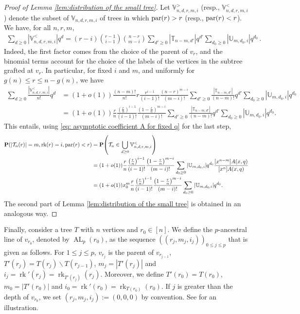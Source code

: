\documentclass{article}
\theoremstyle{remark}
\newcommand{\bT}{\mathbb{T}}
\newcommand{\abs}[1]{{\left|#1\right|}}
\newcommand{\cT}{\mathcal{T}}
\newcommand{\prob}[1]{\mathbf{P}{\left(#1\right)}}
\newcommand{\bV}{\mathbb{V}}
\newcommand{\bU}{\mathbb{U}}
\DeclareMathOperator{\rk}{rk}
\DeclareMathOperator{\AncestralLine}{AL}
\begin{document}
\begin{proof}[Proof of Lemma \ref{lem:distribution of the small tree}]
Let $\bV^>_{n,d,r,m,i}$ (resp., $\bV^<_{n,d,r,m,i}$) denote the subset of $\bV_{n,d,r,m,i}$ of trees in which ${\rm par}(r)>r$ (resp., ${\rm par}(r)<r$).
We have, for all $n,r,m$,
\begin{align*}
\sum_{d \geq 0} |\bV^<_{n,d,r,m,i}| q^d = (r-i)  \binom{r-1}{i-1} \binom{n-r}{m-i} \sum_{d' \geq 0} |\bT_{n-m,d'}| q^{d'} \sum_{d_0 \geq 0} |\bU_{m,d_0,i}|q^{d_0} \,.
\end{align*}
Indeed, the first factor comes from the choice of the parent of $v_r$, and the binomial terms account for the choice of the labels of the vertices in the subtree grafted at $v_r$. 
In particular, for fixed $i$ and $m$, and uniformly for $g(n) \leq r \leq n-g(n)$, we have
\begin{align*}
\sum_{d \geq 0} \frac{|\bV^<_{n,d,r,m,i}|}{n!} q^d &= (1+o(1))\frac{(n-m)!}{n!} r \frac{r^{i-1}}{(i-1)!} \frac{(n-r)^{m-i}}{(m-i)!} \sum_{d' \geq 0} \frac{|\bT_{n-m,d'}|}{(n-m)!} q^{d'} \sum_{d_0 \geq 0} |\bU_{m,d_0,i}|q^{d_0} \\
&= (1+o(1)) \frac{r}{n}  \frac{\left( \frac{r}{n} \right)^{i-1}}{(i-1)!} \frac{\left( 1 - \frac{r}{n} \right)^{m-i}}{(m-i)!} \sum_{d' \geq 0} \frac{|\bT_{n-m,d'}|}{(n-m)!} q^{d'} \sum_{d_0 \geq 0} |\bU_{m,d_0,i}|q^{d_0}.
\end{align*}
This entails, using \eqref{eq: asymptotic coefficient A for fixed q} for the last step,
\begin{align*}
\prob{\abs{\cT_n(r)}=m, \rk(r)=i, {\rm par}(r)<r} &=\prob{\cT_n \in \bigcup_{d \geq 0}\bV^<_{n,d,r,m,i}}\\
&= (1+o(1)) \frac{r}{n} \frac{\left( \frac{r}{n} \right)^{i-1}}{(i-1)!} \frac{\left( 1 - \frac{r}{n} \right)^{m-i}}{(m-i)!} \sum_{d_0 \geq 0} |\bU_{m,d_0,i}|q^{d_0} \frac{[x^{n-m}] A(x,q)}{[x^n]A(x,q)}\\
&=(1+o(1)) x_0^m\frac{r}{n} \frac{\left( \frac{r}{n} \right)^{i-1}}{(i-1)!} \frac{\left( 1 - \frac{r}{n} \right)^{m-i}}{(m-i)!} \sum_{d_0 \geq 0} |\bU_{m,d_0,i}|q^{d_0}.
\end{align*}
The second part of Lemma \ref{lem:distribution of the small tree} is obtained in an analogous way.
\end{proof}

Finally, consider a tree $T$ with $n$ vertices and $r_0 \in [n]$. 
We define the $p$-ancestral line of $v_{r_0}$, denoted by $\AncestralLine_p(r_0)$, as the sequence $((r_j,m_j,i_j))_{0 \leq j \leq p}$ that is given as follows.
For $1 \leq j \leq p$, $v_{r_j}$ is the parent of $v_{r_{j-1}}$, $T'(r_j)=T(r_j) \backslash T(r_{j-1})$, $m_j = \abs{T'(r_j)}$ and $i_j = \rk'(r_j)=\rk_{T'(r_j)}(r_j)$. Moreover, we define $T'(r_0)=T(r_0)$, $m_0 = \abs{T'(r_0)}$ and $i_0 = \rk'(r_0)=\rk_{T(r_0)}(r_0)$.
If $j$ is greater than the depth of $v_{r_0}$, we set $(r_j,m_j,i_j) := (0,0,0)$ by convention.
See  for an illustration.
\end{document}

